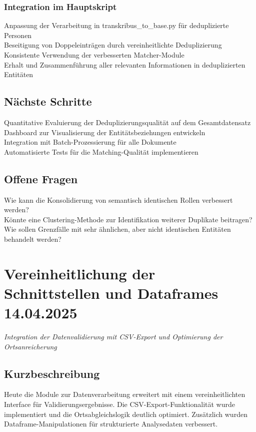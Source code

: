 \documentclass{article}
\begin{document}
\subsubsection*{\small Integration im Hauptskript}
 Anpassung der Verarbeitung in transkribus\_to\_base.py für deduplizierte Personen\\
 Beseitigung von Doppeleinträgen durch vereinheitlichte Deduplizierung\\
 Konsistente Verwendung der verbesserten Matcher-Module\\
 Erhalt und Zusammenführung aller relevanten Informationen in deduplizierten Entitäten

\subsection*{Nächste Schritte}
 Quantitative Evaluierung der Deduplizierungsqualität auf dem Gesamtdatensatz\\
 Dashboard zur Visualisierung der Entitätsbeziehungen entwickeln\\
 Integration mit Batch-Prozessierung für alle Dokumente\\
 Automatisierte Tests für die Matching-Qualität implementieren

\subsection*{Offene Fragen}
 Wie kann die Konsolidierung von semantisch identischen Rollen verbessert werden?\\
 Könnte eine Clustering-Methode zur Identifikation weiterer Duplikate beitragen?\\
 Wie sollen Grenzfälle mit sehr ähnlichen, aber nicht identischen Entitäten behandelt werden?\\

\section{Vereinheitlichung der Schnittstellen und Dataframes \small 14.04.2025}
\small\textit{Integration der Datenvalidierung mit CSV-Export und Optimierung der Ortsanreicherung}\\

\subsection*{Kurzbeschreibung}
Heute die Module zur Datenverarbeitung erweitert mit einem vereinheitlichten Interface für Validierungsergebnisse. Die CSV-Export-Funktionalität wurde implementiert und die Ortsabgleichslogik deutlich optimiert. Zusätzlich wurden Dataframe-Manipulationen für strukturierte Analysedaten verbessert.
\end{document}
